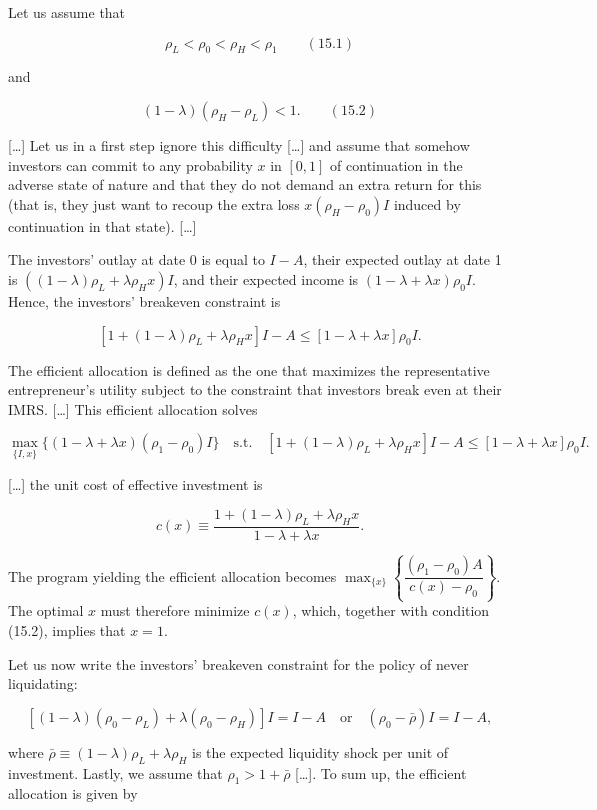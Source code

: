\documentclass[11pt,a4paper]{article}
\begin{document}
Let us assume that

\[\rho_L < \rho_0 < \rho_H < \rho_1 \qquad (15.1)\]

and

\[(1 - \lambda)(\rho_H - \rho_L) < 1. \qquad (15.2)\]

{[}\ldots{]} Let us in a first step ignore this difficulty {[}\ldots{]} and assume that somehow
investors can commit to any probability \(x\) in \([0, 1]\) of continuation in the adverse state of
nature and that they do not demand an extra return for this (that is, they just want to recoup the
extra loss \(x(\rho_H - \rho_0)I\) induced by continuation in that state). {[}\ldots{]}

The investors' outlay at date 0 is equal to \(I - A\), their expected outlay at date 1 is
\(((1 - \lambda)\rho_L + \lambda\rho_H x)I\), and their expected income is
\((1 - \lambda + \lambda x)\rho_0 I\). Hence, the investors' breakeven constraint is

\[[1 + (1 - \lambda)\rho_L + \lambda\rho_H x]I - A \leqslant [1 - \lambda + \lambda x]\rho_0 I.\]

The efficient allocation is defined as the one that maximizes the representative entrepreneur's
utility subject to the constraint that investors break even at their IMRS. {[}\ldots{]} This
efficient allocation solves

\[\max_{\{I, x\}} \{(1 - \lambda + \lambda x)(\rho_1 - \rho_0)I\} \quad \text{s.t.} \quad [1 + (1 - \lambda)\rho_L + \lambda\rho_H x]I - A \leqslant [1 - \lambda + \lambda x]\rho_0 I.\]

{[}\ldots{]} the unit cost of effective investment is

\[c(x) \equiv \frac{1 + (1 - \lambda)\rho_L + \lambda\rho_H x}{1 - \lambda + \lambda x}.\]

The program yielding the efficient allocation becomes
\(\max_{\{x\}} \left\{\dfrac{(\rho_1 - \rho_0)A}{c(x) - \rho_0}\right\}\). The optimal \(x\) must
therefore minimize \(c(x)\), which, together with condition (15.2), implies that \(x = 1\).

Let us now write the investors' breakeven constraint for the policy of never liquidating:

\[[(1 - \lambda)(\rho_0 - \rho_L) + \lambda(\rho_0 - \rho_H)]I = I - A \quad\text{or}\quad (\rho_0 - \bar\rho)I = I - A,\]

where \(\bar\rho \equiv (1 - \lambda)\rho_L + \lambda\rho_H\) is the expected liquidity shock per
unit of investment. Lastly, we assume that \(\rho_1 > 1 + \bar\rho\) {[}\ldots{]}. To sum up, the
efficient allocation is given by
\end{document}
